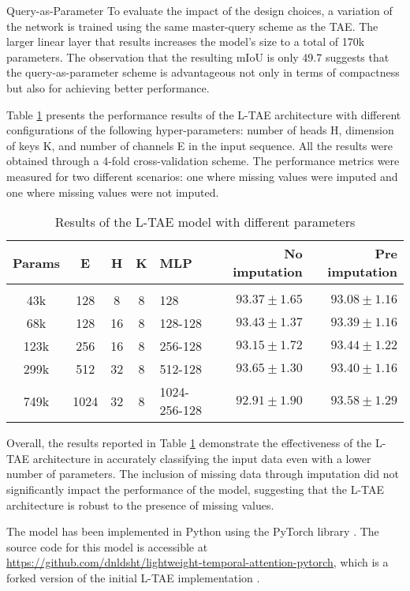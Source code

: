 \begin{paragraph} {Query-as-Parameter}
To evaluate the impact of the design choices, a variation of the network is trained using the same master-query scheme as the TAE.
The larger linear layer that results increases the model's size to a total of 170k parameters.
The observation that the resulting mIoU is only 49.7 suggests that the query-as-parameter scheme is advantageous not only in terms of compactness but also for achieving better performance.
\end{paragraph}

Table \ref{tab:LTAEresults} presents the performance results of the L-TAE architecture with different configurations of the following hyper-parameters: number of heads H, dimension of keys K, and number of channels E in the input sequence.
All the results were obtained through a 4-fold cross-validation scheme.
The performance metrics were measured for two different scenarios: one where missing values were imputed and one where missing values were not imputed.

\begin{table}[H]
  \centering
  \begin{tabular}{cccclrr} 
     Params & E & H & K & MLP & No imputation & Pre imputation\\[0.2cm] 
     \hline \\[-0.2cm] 
     43k & 	128 & 	8 & 	8 & 	128 & 	$93.37 \pm 1.65$ & 	$93.08 \pm 1.16$\\ 
     68k & 	128 & 	16 & 	8 & 	128-128 & 	$93.43 \pm 1.37$ & 	$93.39 \pm 1.16$\\ 
     123k & 	256 & 	16 & 	8 & 	256-128 & 	$93.15 \pm 1.72$ & 	$93.44 \pm 1.22$\\ 
     299k & 	512 & 	32 & 	8 & 	512-128 & 	$\mathbf{93.65 \pm 1.30}$ & 	$93.40 \pm 1.16$\\ 
     749k & 	1024 & 	32 & 	8 & 	1024-256-128 & 	$92.91 \pm 1.90$ & 	$\mathbf{93.58 \pm 1.29}$\\ 
  \end{tabular}
  \caption{Results of the L-TAE model with different parameters}
  \label{tab:LTAEresults}
\end{table}

Overall, the results reported in Table \ref{tab:LTAEresults} demonstrate the effectiveness of the L-TAE architecture in accurately classifying the input data even with a lower number of parameters. 
The inclusion of missing data through imputation did not significantly impact the performance of the model, suggesting that the L-TAE architecture is robust to the presence of missing values.


The model has been implemented in Python using the PyTorch library \cite{NEURIPS2019_9015}.
The source code for this model is accessible at \url{https://github.com/dnldsht/lightweight-temporal-attention-pytorch}, which is a forked version of the initial L-TAE implementation \cite{LTAE}.